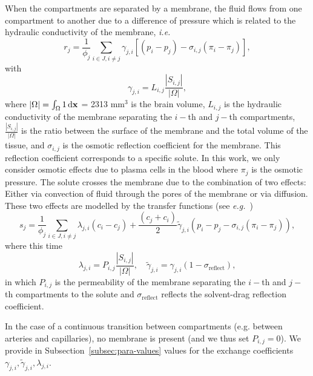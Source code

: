 \documentclass[10pt]{article}
\newcommand{\ie}{\emph{i.e.}\;}
\newcommand{\eg}{\emph{e.g.}\;}
\newcommand{\1}{^{(1)}}
\newcommand{\2}{^{(2)}}
\newcommand*{\dd}{\mathop{\kern0pt\mathrm{d}}\!{}}
\newcommand {\f}   {\frac}
\newcommand{\abs}[1]{\left\lvert#1\right\rvert}
\newcommand {\x}   {\mathbf{x}}
\begin{document}
When the compartments are separated by a membrane, the fluid flows from one compartment to another due to a difference of pressure which is related to the hydraulic conductivity of the membrane, \ie 
\begin{equation}
    r_j = \frac{1}{\phi_j}\sum_{i\in J, i\neq j} \gamma_{j , i} \left[(p_i - p_j)-\sigma_{i,j}(\pi_i-\pi_j)\right],
\end{equation} 
with 
\begin{equation}
\gamma_{j , i} = L_{i,j} \f{\abs{S_{i,j}}}{\abs{\Omega}},
\end{equation}
where $|\Omega| = \int_\Omega 1 \dd \x$ = 2313 mm$^3$ is the brain volume, $L_{i,j}$ is the hydraulic conductivity of the membrane separating the $i-$th and $j-$th compartments, $\f{\abs{S_{i,j}}}{\abs{\Omega}}$ is the ratio between the surface of the membrane and the total volume of the tissue, and $\sigma_{i,j}$ is the osmotic reflection coefficient for the membrane. This reflection coefficient corresponds to a specific solute. In this work, we only consider osmotic effects due to plasma cells in the blood where $\pi_j$ is the osmotic pressure. 
The solute crosses the membrane due to the combination of two effects: Either via convection of fluid through the pores of the membrane or via diffusion. These two effects are modelled by the transfer functions (see \eg~\cite{jarzynska2006application})
\begin{equation}
    s_j = \frac{1}{\phi_j}  \sum_{i\in J, i\neq j}\lambda_{j , i} ( c_i- c_j) +  \frac{(c_j+c_i)}{2} \tilde \gamma_{j , i} (p_i - p_j-\sigma_{i,j}(\pi_i-\pi_j)) ,
\end{equation}
where this time 
\[
    \lambda_{j , i} = P_{i,j} \f{\abs{S_{i,j}}}{\abs{\Omega}}, \quad \tilde \gamma_{j , i} =  \gamma_{j , i} (1-\sigma_\text{reflect}),
\]
in which $P_{i,j}$ is the permeability of the membrane separating the $i-$th and $j-$th compartments to the solute and $\sigma_\text{reflect}$ reflects the solvent-drag reflection coefficient. 


In the case of a continuous transition between compartments (e.g. between arteries and capillaries), no membrane is present (and we thus set $P_{i,j} = 0$). We provide in Subsection~\ref{subsec:para-values} values for the exchange coefficients $\gamma_{j , i}, \tilde \gamma_{j , i}, \lambda_{j , i}$.
\end{document}
